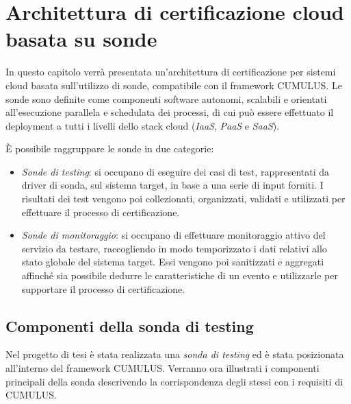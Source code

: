 \documentclass[../main.tex]{subfiles}
\begin{document}
\chapter{Architettura di certificazione cloud basata su sonde}
In questo capitolo verrà presentata un'architettura di certificazione per sistemi cloud basata sull'utilizzo di sonde, compatibile con il framework CUMULUS.
Le sonde sono definite come componenti software autonomi, scalabili e orientati all'esecuzione parallela e schedulata dei processi, di cui può essere effettuato il deployment a tutti i livelli dello stack cloud (\textit{IaaS}, \textit{PaaS} e \textit{SaaS}).

\`E possibile raggruppare le sonde in due categorie:
\begin{itemize}
\item \textit{Sonde di testing}: si occupano di eseguire dei casi di test, rappresentati da driver di sonda, sul sistema target, in base a una serie di input forniti. I risultati dei test vengono poi collezionati, organizzati, validati e utilizzati per effettuare il processo di certificazione.
\item \textit{Sonde di monitoraggio}: si occupano di effettuare monitoraggio attivo del servizio da testare, raccogliendo in modo temporizzato i dati relativi allo stato globale del sistema target. Essi vengono poi sanitizzati e aggregati affinché sia possibile dedurre le caratteristiche di un evento e utilizzarle per supportare il processo di certificazione.
\end{itemize}
\newpage
\section{Componenti della sonda di testing}
Nel progetto di tesi è stata realizzata una \textit{sonda di testing} ed è stata posizionata all'interno del framework CUMULUS.
Verranno ora illustrati i componenti principali della sonda descrivendo la corrispondenza degli stessi con i requisiti di CUMULUS.
\end{document}
